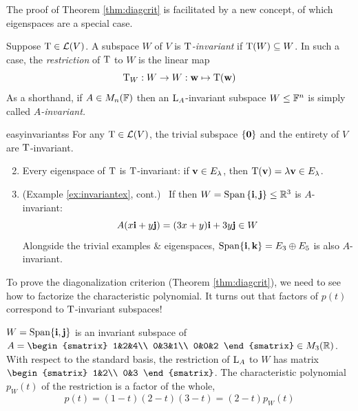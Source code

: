 The proof of Theorem \ref{thm:diagcrit} is facilitated by a new concept, of which eigenspaces are a special case.

\begin{defn}{}{}
	Suppose $\mathrm{T}\in\mathcal{L}(V)$. A subspace $W$ of $V$ is \emph{$\mathrm{T}$-invariant} if $\mathrm{T}(W)\subseteq W$. In such a case, the \emph{restriction} of $\mathrm{T}$ to $W$ is the linear map
	\[
		\mathrm{T}_W:W\to W:{\mathbf{w}}\mapsto \mathrm{T}({\mathbf{w}})
	\]
	As a shorthand, if $A\in M_n(\mathbb{F})$ then an $\mathrm{L}_A$-invariant subspace $W\le\mathbb{F}^n$ is simply called \emph{$A$-invariant.}
\end{defn}


\begin{examples}{}{easyinvariantss}
	\exstart For any $\mathrm{T}\in\mathcal{L}(V)$, the trivial subspace $\{\mathbf{0}\}$ and the entirety of $V$ are $\mathrm{T}$-invariant.
	\begin{enumerate}\setcounter{enumi}{1}
	  \item Every eigenspace of $\mathrm{T}$ is $\mathrm{T}$-invariant: if ${\mathbf{v}}\in E_\lambda$, then $\mathrm{T}({\mathbf{v}})=\lambda{\mathbf{v}}\in E_\lambda$.
	  \item\label{ex:easyinv3} (Example \ref{ex:invariantex}, cont.) \ If  
	  then $W=\operatorname{Span}\left\{{\mathbf{i}},{\mathbf{j}}\right\}\le\mathbb{R}^3$ is $A$-invariant:
	  \[
	  	A(x{\mathbf{i}}+y{\mathbf{j}})=(3x+y){\mathbf{i}}+3y{\mathbf{j}}\in W
	  \]
	  Alongside the trivial examples \& eigenspaces, $\operatorname{Span}\{{\mathbf{i}},{\mathbf{k}}\}=E_3\oplus E_5$ is also $A$-invariant.
	\end{enumerate}
\end{examples}


To prove the diagonalization criterion (Theorem \ref{thm:diagcrit}), we need to see how to factorize the characteristic polynomial. It turns out that factors of $p(t)$ correspond to $\mathrm{T}$-invariant subspaces!

\begin{example}{}{}
	$W=\operatorname{Span}\{{\mathbf{i}},{\mathbf{j}}\}$ is an invariant subspace of $A=
	\begin{smatrix}
	  1&2&4\\
	  0&3&1\\
	  0&0&2
  \end{smatrix}
  \in M_3(\R)$. With respect to the standard basis, the restriction of $\mathrm{L}_A$ to $W$ has matrix 
  $\begin{smatrix}
  	1&2\\
  	0&3
  \end{smatrix}$. 
  The characteristic polynomial $p_W(t)$ of the restriction is a factor of the whole,
  \[
  	p(t)=(1-t)(2-t)(3-t)=(2-t)p_W(t)
  \]
\end{example}



